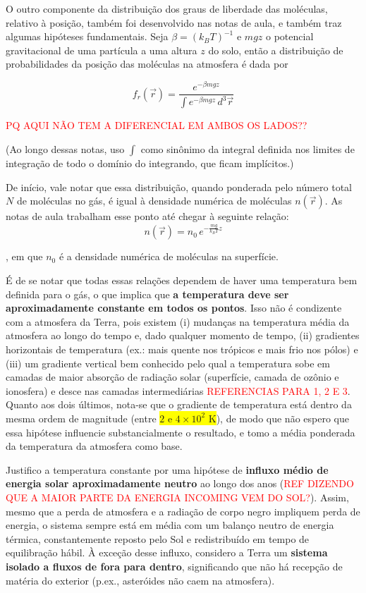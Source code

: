 \documentclass[12pt]{extarticle} %
\begin{document}
\par O outro componente da distribuição dos graus de liberdade das moléculas, relativo à posição, também foi desenvolvido nas notas de aula, e também traz algumas hipóteses fundamentais. Seja $\beta=(k_BT)^{-1}$ e $mgz$ o potencial gravitacional de uma partícula a uma altura $z$ do solo, então a distribuição de probabilidades da posição das moléculas na atmosfera é dada por

$$f_r(\vec{r})=\frac{e^{-\beta mgz}}{\int e^{-\beta mgz} \, d^3 \vec{r} }$$

\textcolor{red}{PQ AQUI NÃO TEM A DIFERENCIAL EM AMBOS OS LADOS??}

(Ao longo dessas notas, uso $\int$ como sinônimo da integral definida nos limites de integração de todo o domínio do integrando, que ficam implícitos.)

De início, vale notar que essa distribuição, quando ponderada pelo número total $N$ de moléculas no gás, é igual à densidade numérica de moléculas $n(\vec{r})$. As notas de aula trabalham esse ponto até chegar à seguinte relação:
\begin{equation}
    n(\vec{r})=n_0 \, e^{-\frac{mg}{k_BT}z}
\label{densidade}
\end{equation}

\noindent , em que $n_0$ é a densidade numérica	de moléculas na superfície.

\par É de se notar que todas essas relações dependem de haver uma temperatura bem definida para o gás, o que implica que \textbf{a temperatura deve ser aproximadamente constante em todos os pontos}. Isso não é condizente com a atmosfera da Terra, pois existem (i) mudanças na temperatura média da atmosfera ao longo do tempo e, dado qualquer momento de tempo, (ii) gradientes horizontais de temperatura (ex.: mais quente nos trópicos e mais frio nos pólos) e (iii) um gradiente vertical bem conhecido pelo qual a temperatura sobe em camadas de maior absorção de radiação solar (superfície, camada de ozônio e ionosfera) e desce nas camadas intermediárias \textcolor{red}{REFERENCIAS PARA 1, 2 E 3}. Quanto aos dois últimos, nota-se que o gradiente de temperatura está dentro da mesma ordem de magnitude (entre \colorbox{yellow}{$2$ e $4\times 10^2$ K}), de modo que não espero que essa hipótese influencie substancialmente o resultado, e tomo a média ponderada da temperatura da atmosfera como base. 

\par Justifico a temperatura constante por uma hipótese de \textbf{influxo médio de energia solar aproximadamente neutro} ao longo dos anos (\textcolor{red}{REF DIZENDO QUE A MAIOR PARTE DA ENERGIA INCOMING VEM DO SOL?}). Assim, mesmo que a perda de atmosfera e a radiação de corpo negro impliquem perda de energia, o sistema sempre está em média com um balanço neutro de energia térmica, constantemente reposto pelo Sol e redistribuído em tempo de equilibração hábil. À exceção desse influxo, considero a Terra um \textbf{sistema isolado a fluxos de fora para dentro}, significando que não há recepção de matéria do exterior (p.ex., asteróides não caem na atmosfera).
\end{document}
